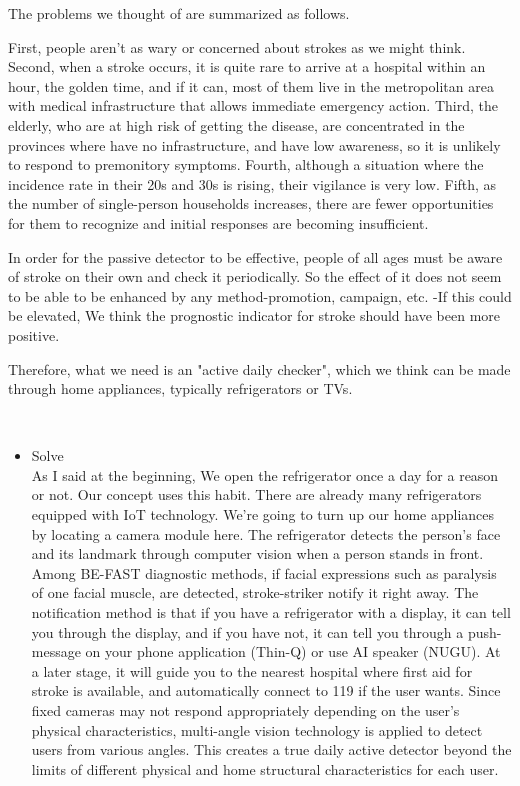 \begin{itemize}
The problems we thought of are summarized as follows.

First, people aren't as wary or concerned about strokes as we might think.
Second, when a stroke occurs, it is quite rare to arrive at a hospital within an hour, the golden time, and if it can, most of them live in the metropolitan area with medical infrastructure that allows immediate emergency action.
Third, the elderly, who are at high risk of getting the disease, are concentrated in the provinces where have no infrastructure, and have low awareness, so it is unlikely to respond to premonitory symptoms.
Fourth, although a situation where the incidence rate in their 20s and 30s is rising, their vigilance is very low.
Fifth, as the number of single-person households increases, there are fewer opportunities for them to recognize and initial responses are becoming insufficient.

In order for the passive detector to be effective, people of all ages must be aware of stroke on their own and check it periodically. So the effect of it does not seem to be able to be enhanced by any method-promotion, campaign, etc. -If this could be elevated, We think \cite{r12}the prognostic indicator for stroke should have been more positive.

Therefore, what we need is an "active daily checker", which we think can be made through home appliances, typically refrigerators or TVs.
    
\end{itemize}
\\
\begin{itemize}
    \item Solve\\
    As I said at the beginning, \cite{r7} We open the refrigerator once a day for a reason or not. Our concept uses this habit.
There are already many refrigerators equipped with IoT technology. We're going to turn up our home appliances by locating a camera module here.
The refrigerator detects the person's face and its landmark through computer vision when a person stands in front. 
Among BE-FAST diagnostic methods, if facial expressions such as paralysis of one facial muscle, are detected, stroke-striker notify it right away.
The notification method is that if you have a refrigerator with a display, it can tell you through the display, and if you have not, it can tell you through a push-message on your phone application (Thin-Q) or use AI speaker (NUGU).
At a later stage, it will guide you to the nearest hospital where first aid for stroke is available, and automatically connect to 119 if the user wants.
Since fixed cameras may not respond appropriately depending on the user's physical characteristics, \cite{r13} multi-angle vision technology is applied to detect users from various angles.
This creates a true daily active detector beyond the limits of different physical and home structural characteristics for each user.
\end{itemize}
